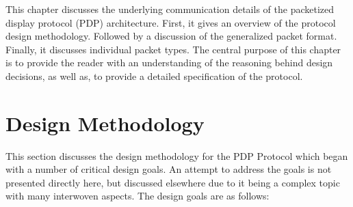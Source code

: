 \label{chap:pdp_protocol}

This chapter discusses the underlying communication details of the packetized display protocol (PDP) architecture. First, it gives an overview of the protocol design methodology. Followed by a discussion of the generalized packet format. Finally, it discusses individual packet types. The central purpose of this chapter is to provide the reader with an understanding of the reasoning behind design decisions, as well as, to provide a detailed specification of the protocol.

\section{Design Methodology}
    \label{sec:design_methodology}
    This section discusses the design methodology for the PDP Protocol which began with a number of critical design goals\cite{LandwehrEtAl2019}. An attempt to address the goals is not presented directly here, but discussed  elsewhere due to it being a complex topic with many interwoven aspects. The design goals are as follows:

